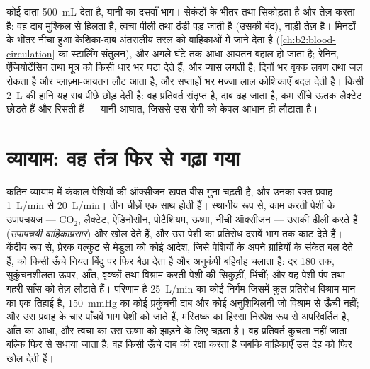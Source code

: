 \begin{example}[एक रक्तस्राव]\label{ex:b2:blood-pressure:haemorrhage}
कोई दाता \qty{500}{mL} देता है, यानी  का दसवाँ भाग। सेकंडों के भीतर
  तथा  सिकोड़ता है और
 तेज़ करता है: वह दाब मुश्किल से हिलता है, त्वचा पीली तथा ठंडी पड़ जाती है
(उसकी  बंद), नाड़ी तेज़ है। मिनटों के भीतर
नीचा हुआ केशिका-दाब अंतरालीय तरल को वाहिकाओं में जाने देता
है (\cref{ch:b2:blood-circulation} का स्टार्लिंग संतुलन),
और अगले घंटे तक आधा आयतन बहाल हो जाता है; रेनिन, ऐंजियोटेंसिन तथा
 मूत्र को किसी धार भर घटा देते हैं, और प्यास
लगती है; दिनों भर वृक्क लवण तथा जल रोकता है और
प्लाज़्मा-आयतन लौट आता है, और सप्ताहों भर मज्जा लाल कोशिकाएँ बदल देती है। किसी
\qty{2}{L} की हानि यह सब पीछे छोड़ देती है: वह प्रतिवर्त संतृप्त है,
दाब ढह जाता है, कम सींचे ऊतक लैक्टेट छोड़ते हैं
और  रिसती हैं --- यानी आघात, जिससे उस रोगी को केवल आधान ही
लौटाता है।
\end{example}

\section{व्यायाम: वह तंत्र फिर से गढ़ा गया}

\begin{proposition}[व्यायाम]\label{prop:b2:blood-pressure:exercise}
कठिन व्यायाम में कंकाल पेशियों की ऑक्सीजन-खपत
बीस गुना चढ़ती है, और उनका रक्त-प्रवाह \qty{1}{L/min} से \qty{20}{L/min}।
तीन चीज़ें एक साथ होती हैं। स्थानीय रूप से, काम करती पेशी के उपापचयज
--- $\mathrm{CO_2}$, लैक्टेट, ऐडिनोसीन, पोटैशियम, ऊष्मा,
नीची ऑक्सीजन --- उसकी  ढीली करते हैं (\emph{उपापचयी वाहिकाप्रसार})
और  खोल देते हैं, और उस पेशी का प्रतिरोध
दसवें भाग तक काट देते हैं। केंद्रीय रूप से, प्रेरक वल्कुट से मेडुला को कोई आदेश,
जिसे पेशियों के अपने ग्राहियों के संकेत बल देते हैं,
 को किसी ऊँचे नियत बिंदु पर फिर बैठा देता है और अनुकंपी बहिर्वाह चलाता है:
दर 180 तक, सुकुंचनशीलता ऊपर, आँत, वृक्कों तथा
विश्राम करती पेशी की  सिकुड़ीं,  भिंचीं; और वह पेशी-पंप तथा
गहरी साँस  को तेज़ लौटाते हैं। परिणाम है
\qty{25}{L/min} का कोई निर्गम जिसमें कुल प्रतिरोध विश्राम-मान का एक तिहाई है,
\qty{150}{mmHg} का कोई प्रकुंचनी दाब और कोई अनुशिथिलनी जो विश्राम से ऊँची
नहीं; और उस प्रवाह के चार पाँचवें भाग पेशी को जाते हैं, मस्तिष्क का
हिस्सा निरपेक्ष रूप से अपरिवर्तित है, आँत का आधा, और
त्वचा का उस ऊष्मा को झाड़ने के लिए चढ़ता है। वह प्रतिवर्त कुचला नहीं जाता बल्कि
फिर से सधाया जाता है: वह किसी ऊँचे दाब की रक्षा करता है जबकि वाहिकाएँ उस देह को
फिर खोल देती हैं।
\end{proposition}

